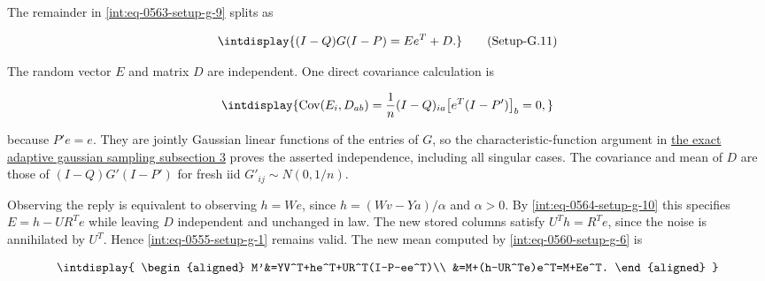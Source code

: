
The remainder in \hyperref[int:eq-setup-g-9]{\eqref{int:eq-0563-setup-g-9}} splits as


\label{int:eq-setup-g-11}
\begingroup\renewcommand{\theHequation}{intdisplay.1067}
\begin{equation}
\intdisplay{
(I-Q)G(I-P)=Ee^T+D.
}
\tag{Setup-G.11}
\label{int:eq-0565-setup-g-11}
\end{equation}
\endgroup


The random vector \(E\) and matrix \(D\) are independent. One direct covariance calculation is


\begingroup\renewcommand{\theHequation}{intdisplay.1068}
\begin{equation*}
\intdisplay{
\operatorname{Cov}(E_i,D_{ab})
 =\frac1n(I-Q)_{ia}\bigl[e^T(I-P')\bigr]_b=0,
}
\end{equation*}
\endgroup


because \(P'e=e\). They are jointly Gaussian linear functions of the entries of \(G\), so the characteristic-function argument in \hyperref[int:setup-sampler-3]{the exact adaptive gaussian sampling subsection 3} proves the asserted independence, including all singular cases. The covariance and mean of \(D\) are those of \((I-Q)G'(I-P')\) for fresh iid \(G'_{ij}\sim N(0,\allowbreak 1/n)\).



Observing the reply is equivalent to observing \(h=We\), since \(h=(Wv-Ya)/\alpha\) and \(\alpha>0\). By \hyperref[int:eq-setup-g-10]{\eqref{int:eq-0564-setup-g-10}} this specifies \(E=h-UR^T e\) while leaving \(D\) independent and unchanged in law. The new stored columns satisfy \(U^Th=R^Te\), since the noise is annihilated by \(U^T\). Hence \hyperref[int:eq-setup-g-1]{\eqref{int:eq-0555-setup-g-1}} remains valid. The new mean computed by \hyperref[int:eq-setup-g-6]{\eqref{int:eq-0560-setup-g-6}} is


\begingroup\renewcommand{\theHequation}{intdisplay.1069}
\begin{equation*}
\intdisplay{
\begin{aligned}
 M'&=YV^T+he^T+UR^T(I-P-ee^T)\\
   &=M+(h-UR^Te)e^T=M+Ee^T.
\end{aligned}
}
\end{equation*}
\endgroup

